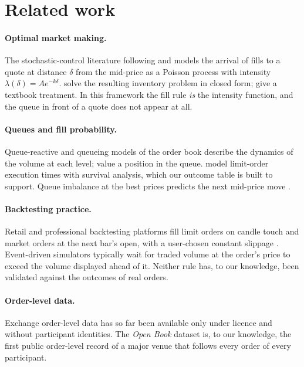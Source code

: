 \section{Related work}
\label{sec:related}

\paragraph{Optimal market making.}
The stochastic-control literature following \citet{ho1981optimal} and
\citet{avellaneda2008high} models the arrival of fills to a quote at distance
$\delta$ from the mid-price as a Poisson process with intensity
$\lambda(\delta)=A e^{-k\delta}$. \citet{gueant2013dealing} solve the resulting
inventory problem in closed form; \citet{cartea2015algorithmic} give a
textbook treatment. In this framework the fill rule \emph{is} the intensity
function, and the queue in front of a quote does not appear at all.

\paragraph{Queues and fill probability.}
Queue-reactive and queueing models of the order book
\citep{cont2010stochastic,huang2015simulating} describe the dynamics of the
volume at each level; \citet{moallemi2016model} value a position in the queue.
\citet{lo2002econometric} model limit-order execution times with survival
analysis, which our outcome table is built to support. Queue imbalance at the
best prices predicts the next mid-price move \citep{gould2016queue}.

\paragraph{Backtesting practice.}
Retail and professional backtesting platforms fill limit orders on candle
touch and market orders at the next bar's open, with a user-chosen constant
slippage . Event-driven simulators typically wait for traded volume at the
order's price to exceed the volume displayed ahead of it. Neither rule has, to
our knowledge, been validated against the outcomes of real orders.

\paragraph{Order-level data.}
Exchange order-level data has so far been available only under licence and
without participant identities. The \emph{Open Book} dataset
\citep{albers2026openbook} is, to our knowledge, the first public order-level
record of a major venue that follows every order of every participant.

